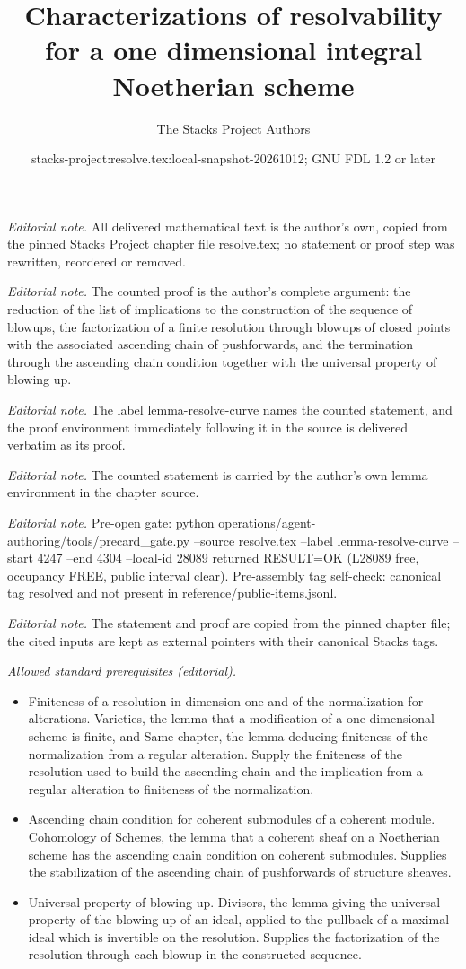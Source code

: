 \documentclass[10pt,a4paper]{amsart}
\title{Characterizations of resolvability for a one dimensional integral Noetherian scheme}
\author{The Stacks Project Authors}
\date{stacks-project:resolve.tex:local-snapshot-20261012; GNU FDL 1.2 or later}
\theoremstyle{plain}
\theoremstyle{definition}
\theoremstyle{remark}
\numberwithin{equation}{subsection}
\begin{document}
\maketitle
\noindent\textit{Editorial note.} All delivered mathematical text is the author's own, copied from the pinned Stacks Project chapter file resolve.tex; no statement or proof step was rewritten, reordered or removed.\par\medskip
\noindent\textit{Editorial note.} The counted proof is the author's complete argument: the reduction of the list of implications to the construction of the sequence of blowups, the factorization of a finite resolution through blowups of closed points with the associated ascending chain of pushforwards, and the termination through the ascending chain condition together with the universal property of blowing up.\par\medskip
\noindent\textit{Editorial note.} The label lemma-resolve-curve names the counted statement, and the proof environment immediately following it in the source is delivered verbatim as its proof.\par\medskip
\noindent\textit{Editorial note.} The counted statement is carried by the author's own lemma environment in the chapter source.\par\medskip
\noindent\textit{Editorial note.} Pre-open gate: python operations/agent-authoring/tools/precard\_gate.py --source resolve.tex --label lemma-resolve-curve --start 4247 --end 4304 --local-id 28089 returned RESULT=OK (L28089 free, occupancy FREE, public interval clear). Pre-assembly tag self-check: canonical tag resolved and not present in reference/public-items.jsonl.\par\medskip
\noindent\textit{Editorial note.} The statement and proof are copied from the pinned chapter file; the cited inputs are kept as external pointers with their canonical Stacks tags.\par\medskip
\noindent\textit{Allowed standard prerequisites (editorial).}\begin{itemize}
\item Finiteness of a resolution in dimension one and of the normalization for alterations. Varieties, the lemma that a modification of a one dimensional scheme is finite, and Same chapter, the lemma deducing finiteness of the normalization from a regular alteration. Supply the finiteness of the resolution used to build the ascending chain and the implication from a regular alteration to finiteness of the normalization.
\item Ascending chain condition for coherent submodules of a coherent module. Cohomology of Schemes, the lemma that a coherent sheaf on a Noetherian scheme has the ascending chain condition on coherent submodules. Supplies the stabilization of the ascending chain of pushforwards of structure sheaves.
\item Universal property of blowing up. Divisors, the lemma giving the universal property of the blowing up of an ideal, applied to the pullback of a maximal ideal which is invertible on the resolution. Supplies the factorization of the resolution through each blowup in the constructed sequence.
\end{itemize}\medskip
\end{document}
